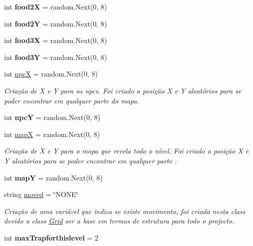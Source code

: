 \begin{DoxyCompactItemize}
int {\bfseries food2X} = random.\+Next(0, 8)
\item 
\mbox{\label{class_projeto2___l_p1_1_1_grid_aa6069ba956dc78e57099a7c2822702cb}} 
int {\bfseries food2Y} = random.\+Next(0, 8)
\item 
\mbox{\label{class_projeto2___l_p1_1_1_grid_ad3deb58a06f700ba8e2ddd0523087aba}} 
int {\bfseries food3X} = random.\+Next(0, 8)
\item 
\mbox{\label{class_projeto2___l_p1_1_1_grid_a9de1c9de8e0e9d4ba8908ca31dea6d79}} 
int {\bfseries food3Y} = random.\+Next(0, 8)
\item 
int \mbox{\hyperlink{class_projeto2___l_p1_1_1_grid_a287fe8d6c874a537ba1191acc155a4a0}{npcX}} = random.\+Next(0, 8)
\begin{DoxyCompactList}\small\item\em Criação de X e Y para os npcs. Foi criado a posição X e Y aleatórios para se poder encontrar em qualquer parte do mapa. \end{DoxyCompactList}\item 
\mbox{\label{class_projeto2___l_p1_1_1_grid_a559beb655a319e836e806d84e96e1c51}} 
int {\bfseries npcY} = random.\+Next(0, 8)
\item 
int \mbox{\hyperlink{class_projeto2___l_p1_1_1_grid_aceb1cce0decd21c4032bf01968c1dbb6}{mapX}} = random.\+Next(0, 8)
\begin{DoxyCompactList}\small\item\em Criação de X e Y para o mapa que revela todo o nível. Foi criado a posição X e Y aleatórios para se poder encontrar em qualquer parte . \end{DoxyCompactList}\item 
\mbox{\label{class_projeto2___l_p1_1_1_grid_ae744fda732d83ca38e1d3c1daa9c7f86}} 
int {\bfseries mapY} = random.\+Next(0, 8)
\item 
string \mbox{\hyperlink{class_projeto2___l_p1_1_1_grid_ab758ab4b626f98e3884ef6fcd7cbb429}{moved}} = \char`\"{}N\+O\+NE\char`\"{}
\begin{DoxyCompactList}\small\item\em Criação de uma variável que indica se existe movimento, foi criada nesta class devido a class \mbox{\hyperlink{class_projeto2___l_p1_1_1_grid}{Grid}} ser a base em termos de estrutura para todo o projecto. \end{DoxyCompactList}\item 
\mbox{\label{class_projeto2___l_p1_1_1_grid_a3e421ed5d1ab15fbe40168fdf2114810}} 
int {\bfseries max\+Trapforthislevel} = 2
\end{DoxyCompactItemize}



